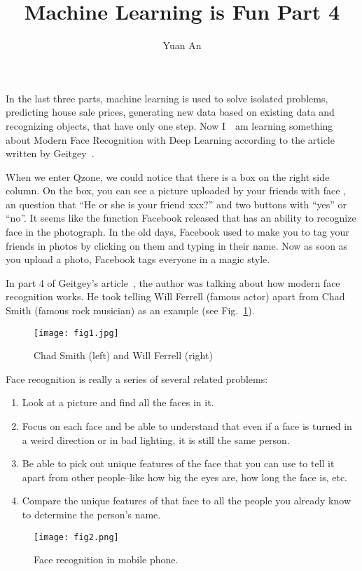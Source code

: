 \documentclass[10pt,twocolumn,letterpaper]{article}
\begin{document}
	\title{Machine Learning is Fun Part 4}	
	\author{Yuan An}
	\maketitle
	In the last three parts, machine learning is used to solve isolated problems, \eg predicting house sale prices, generating new data based on existing data and recognizing objects, that have only one step. Now I　am learning something about Modern Face Recognition with Deep Learning according to the article written by Geitgey~\cite{MLisFun}.
	\par
	When we enter Qzone, we could notice that there is a box on the right side column. On the box, you can see a picture uploaded by your friends with face , an question that ``He or she is your friend xxx?'' and two buttons with ``yes'' or ``no''. It seems like the function Facebook released that has an ability to recognize face in the photograph. In the old days, Facebook used to make you to tag your friends in photos by clicking on them and typing in their name. Now as soon as you upload a photo, Facebook tags everyone in a magic style.
	\par
	In part 4 of Geitgey's article~\cite{MLisFun}, the author was talking about how modern face recognition works. He took telling Will Ferrell (famous actor) apart from Chad Smith (famous rock musician) as an example (see Fig.~\ref{fig1}).
	\begin{figure}[h]
		\centering
		\texttt{[image: fig1.jpg]}
		\caption{Chad Smith (left) and Will Ferrell (right)} \label{fig1}
	\end{figure}
	\par
	Face recognition is really a series of several related problems:
	\begin{enumerate}
		\item Look at a picture and find all the faces in it.
		\item Focus on each face and be able to understand that even if a face is turned in a weird direction or in bad lighting, it is still the same person.
		\item Be able to pick out unique features of the face that you can use to tell it apart from other people--like how big the eyes are, how long the face is, etc. 
		\item Compare the unique features of that face to all the people you already know to determine the person's name.
	\end{enumerate}
	\begin{figure}[h]
		\centering
		\texttt{[image: fig2.png]}
		\caption{Face recognition in mobile phone.}\label{fig2}
	\end{figure}
\end{document}
